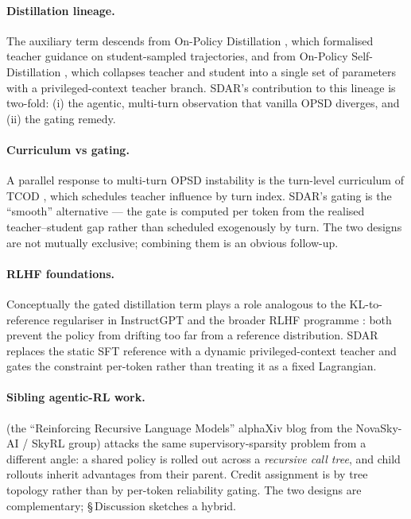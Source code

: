 \documentclass[11pt]{article}
\begin{document}
\paragraph{Distillation lineage.} The auxiliary term descends from On-Policy
Distillation \citep{ye2026opd, yang2026opd}, which formalised teacher
guidance on student-sampled trajectories, and from On-Policy
Self-Distillation \citep{zhao2026opsd}, which collapses teacher and
student into a single set of parameters with a privileged-context
teacher branch. SDAR's contribution to this lineage is two-fold: (i) the
agentic, multi-turn observation that vanilla OPSD diverges, and (ii) the
gating remedy.

\paragraph{Curriculum vs gating.} A parallel response to multi-turn OPSD
instability is the turn-level curriculum of TCOD \citep{wang2026tcod},
which schedules teacher influence by turn index. SDAR's gating is the
``smooth'' alternative --- the gate is computed per token from the
realised teacher--student gap rather than scheduled exogenously by turn.
The two designs are not mutually exclusive; combining them is an obvious
follow-up.

\paragraph{RLHF foundations.} Conceptually the gated distillation term
plays a role analogous to the KL-to-reference regulariser in InstructGPT
\citep{ouyang2022instructgpt} and the broader RLHF programme
\citep{christiano2017deep}: both prevent the policy from drifting too
far from a reference distribution. SDAR replaces the static SFT
reference with a dynamic privileged-context teacher and gates the
constraint per-token rather than treating it as a fixed Lagrangian.

\paragraph{Sibling agentic-RL work.} \citet{rlm2026} (the
``Reinforcing Recursive Language Models'' alphaXiv blog from the
NovaSky-AI / SkyRL group) attacks the same supervisory-sparsity problem
from a different angle: a shared policy is rolled out across a
\emph{recursive call tree}, and child rollouts inherit advantages from
their parent. Credit assignment is by tree topology rather than by
per-token reliability gating. The two designs are complementary;
\S\,Discussion sketches a hybrid.
\end{document}
